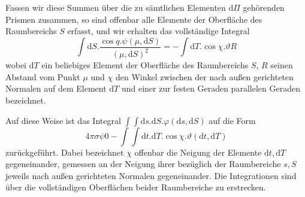 Fassen wir diese Summen über die zu sämtlichen Elementen $\mathrm{d}\Pi$ gehörenden Prismen zusammen, so sind offenbar alle Elemente der Oberfläche des Raumbereichs $S$ erfasst, und wir erhalten das vollständige Integral
\[
\int\mathrm{d}S.\frac{\cos q.\psi(\mu,\mathrm{d}S)}{(\mu,\mathrm{d}S)^2}=-\int\mathrm{d}T.\cos\chi.\vartheta R
\]
wobei $\mathrm{d}T$ ein beliebiges Element der Oberfläche des Raumbereichs $S$, $R$ seinen Abstand vom Punkt $\mu$ und $\chi$ den Winkel zwischen der nach außen gerichteten Normalen auf dem Element $\mathrm{d}T$ und einer zur festen Geraden parallelen Geraden bezeichnet.

Auf diese Weise ist das Integral $\int\int\mathrm{d}s.\mathrm{d}S.\varphi(\mathrm{d}s,\mathrm{d}S)$ auf die Form
\[
4\pi\sigma\psi0-\int\int\mathrm{d}t.\mathrm{d}T.\cos\chi.\vartheta(\mathrm{d}t,\mathrm{d}T)
\]
zurückgeführt. Dabei bezeichnet $\chi$ offenbar die Neigung der Elemente $\mathrm{d}t,\mathrm{d}T$ gegeneinander, gemessen an der Neigung ihrer bezüglich der Raumbereiche $s,S$ jeweils nach außen gerichteten Normalen gegeneinander. Die Integrationen sind über die vollständigen Oberflächen beider Raumbereiche zu erstrecken.

